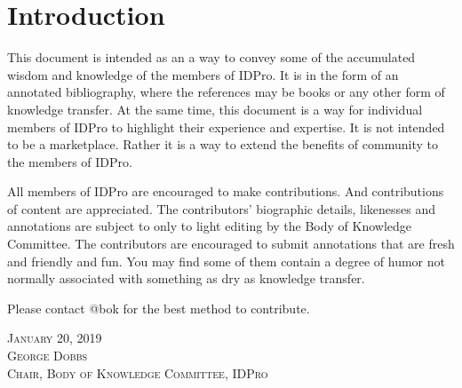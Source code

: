 \section{Introduction}
This document is intended as an a way to convey some of the accumulated wisdom and knowledge of the members of IDPro. 
It is in the form of an annotated bibliography, where the references may be books or any other form of knowledge transfer.  At the same time, this document is a way for individual members of IDPro to highlight their experience and expertise.  It is not intended to be a marketplace.  Rather it is a way to extend the benefits of community to the members of IDPro.

All members of IDPro are encouraged to make contributions.  And contributions of content are appreciated. The contributors' biographic details,  likenesses and annotations are subject to only to light editing by the Body of Knowledge Committee.  The contributors are encouraged to submit annotations that are fresh and friendly and fun. You may find some of them contain a degree of humor not normally associated with something as dry as knowledge transfer.

Please contact @bok for the best method to contribute.

\vspace{24pt}
{\setlength{\parindent}{0cm}
\textsc{
January 20, 2019\\
George Dobbs\\
Chair, Body of Knowledge Committee, IDPro}
}